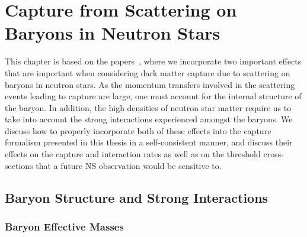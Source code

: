 \graphicspath{{img/capture_baryons/}}
\chapter{Capture from Scattering on Baryons in Neutron Stars}
\label{chapter:capture_baryons}

\begin{synopsis}
   This chapter is based on the papers~\cite{Bell:2020obw_sep_NucleonStructureStrong,Anzuini:2021lnv_nov_Improvedtreatmentdark}, where we incorporate two important effects that are important when considering dark matter capture due to scattering on baryons in neutron stars. 
   As the momentum transfers involved in the scattering events leading to capture are large, one must account for the internal structure of the baryon. In addition, the high densities of neutron star matter require us to take into account the strong interactions experienced amongst the baryons. We discuss how to properly incorporate both of these effects into the capture formalism presented in this thesis in a self-consistent manner, and discuss their effects on the capture and interaction rates as well as on the threshold cross-sections that a future NS observation would be sensitive to. 
\end{synopsis}

\section{Baryon Structure and Strong Interactions}
\label{ch5:sec:baryons_in_NSs}

\subsection{Baryon Effective Masses}
\label{ch5:subsec:strong_ints_meffs}

